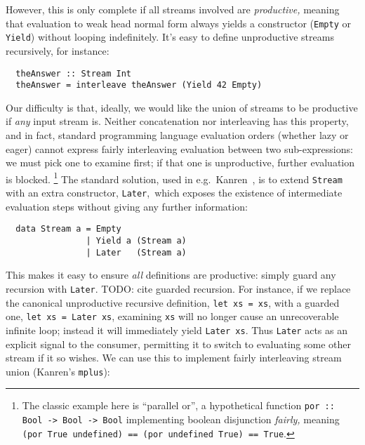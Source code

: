 \documentclass[acmsmall,screen,review,anonymous,dvipsnames]{acmart}
\newcommand\hask[1]{\texttt{#1}}
\newcommand\todo[1]{{\color{Orange}#1}}
\begin{document}
\noindent
However, this is only complete if all streams involved are \emph{productive,} meaning that evaluation to weak head normal form always yields a constructor (\hask{Empty} or \hask{Yield}) without looping indefinitely.
It's easy to define unproductive streams recursively, for instance:

\begin{verbatim}
  theAnswer :: Stream Int
  theAnswer = interleave theAnswer (Yield 42 Empty)
\end{verbatim}


\noindent
Our difficulty is that, ideally, we would like the union of streams to be productive if \emph{any} input stream is.
Neither concatenation nor interleaving has this property, and in fact, standard programming language evaluation orders (whether lazy or eager) cannot express fairly interleaving evaluation between two sub-expressions: we must pick one to examine first; if that one is unproductive, further evaluation is blocked.%
\footnote{The classic example here is ``parallel or'', a hypothetical function \hask{por :: Bool -> Bool -> Bool} implementing boolean disjunction \emph{fairly,} meaning \hask{(por True undefined) == (por undefined True) == True}.}
%
The standard solution, used in e.g.~\textmu{}Kanren~\citep{muKanren}, is to extend \hask{Stream} with an extra constructor, \hask{Later},\footnotemark\ which exposes the existence of intermediate evaluation steps without giving any further information:

\begin{verbatim}
  data Stream a = Empty
                | Yield a (Stream a)
                | Later   (Stream a)
\end{verbatim}

\noindent
This makes it easy to ensure \emph{all} definitions are productive: simply guard any recursion with \hask{Later}.
\todo{TODO: cite guarded recursion.}
For instance, if we replace the canonical unproductive recursive definition, \hask{let xs = xs}, with a guarded one, \hask{let xs = Later xs}, examining \texttt{xs} will no longer cause an unrecoverable infinite loop; instead it will immediately yield \hask{Later xs}.
Thus \hask{Later} acts as an explicit signal to the consumer, permitting it to switch to evaluating some other stream if it so wishes.
We can use this to implement fairly interleaving stream union (\textmu{}Kanren's \texttt{mplus}):
\end{document}
